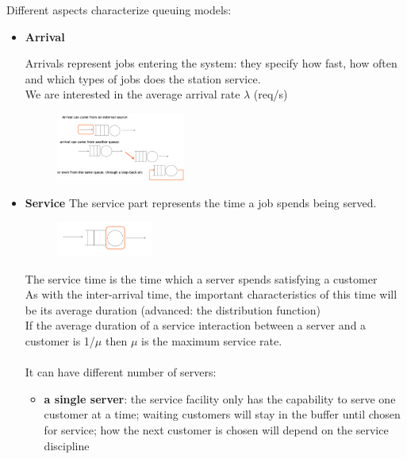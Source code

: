 \documentclass[10pt, oneside]{article}
\begin{document}
Different aspects characterize queuing models:\begin{itemize}
    \item {\bf Arrival}\begin{multicols}{2}
        Arrivals represent jobs entering the system: they specify how fast, how often and which types of jobs does the station service.\\We are interested in the average arrival rate $\lambda$ (req/s)\columnbreak
        \begin{figure}[H]
            \begin{center}
            \includegraphics[width=0.4\textwidth]{img/img95.png}
            \end{center}
        \end{figure}
    \end{multicols}
    \item {\bf Service} The service part represents the time a job spends being served.
    \begin{figure}[H]
        \begin{center}
        \includegraphics[width=0.3\textwidth]{img/img96.png}
        \end{center}
    \end{figure}The service time is the time which a server spends satisfying a customer\\
    As with the inter-arrival time, the important characteristics of this time will be its average duration (advanced: the distribution function)\\
    If the average duration of a service interaction between a server and a customer is 1/$\mu$ then $\mu$ is the maximum service rate.\\\\It can have different number of servers:\begin{itemize}
        \item {\bf a single server}: the service facility only has the capability to serve one customer at a time; waiting customers will stay in the buffer until chosen for service; how the next customer is chosen will depend on the service discipline

\end{itemize}
\end{itemize}
\end{document}
